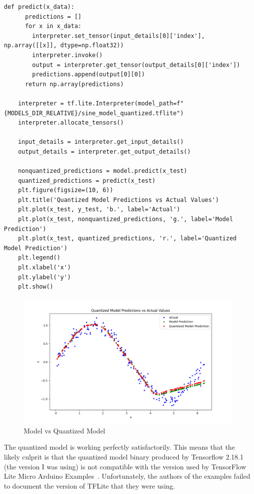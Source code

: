 \documentclass{article}
\begin{document}
    \begin{lstlisting}[label={lst:quant}]
    def predict(x_data):
      predictions = []
      for x in x_data:
        interpreter.set_tensor(input_details[0]['index'], np.array([[x]], dtype=np.float32))
        interpreter.invoke()
        output = interpreter.get_tensor(output_details[0]['index'])
        predictions.append(output[0][0])
      return np.array(predictions)

    interpreter = tf.lite.Interpreter(model_path=f"{MODELS_DIR_RELATIVE}/sine_model_quantized.tflite")
    interpreter.allocate_tensors()

    input_details = interpreter.get_input_details()
    output_details = interpreter.get_output_details()

    nonquantized_predictions = model.predict(x_test)
    quantized_predictions = predict(x_test)
    plt.figure(figsize=(10, 6))
    plt.title('Quantized Model Predictions vs Actual Values')
    plt.plot(x_test, y_test, 'b.', label='Actual')
    plt.plot(x_test, nonquantized_predictions, 'g.', label='Model Prediction')
    plt.plot(x_test, quantized_predictions, 'r.', label='Quantized Model Prediction')
    plt.legend()
    plt.xlabel('x')
    plt.ylabel('y')
    plt.show()
    \end{lstlisting}

    \begin{figure}[!htbp]
        \centerline{\includegraphics[width=0.8\columnwidth]{quantized}}
        \caption{Model vs Quantized Model}
        \label{fig:quantized}
    \end{figure}

    The quantized model is working perfectly satisfactorily.
    This means that the likely culprit is that the quantized model binary produced by Tensorflow 2.18.1 (the version I was using) is not compatible with the version used by TensorFlow Lite Micro Arduino Examples~\cite{tfliteMicroArduino}.
    Unfortunately, the authors of the examples failed to document the version of TFLite that they were using.
\end{document}
